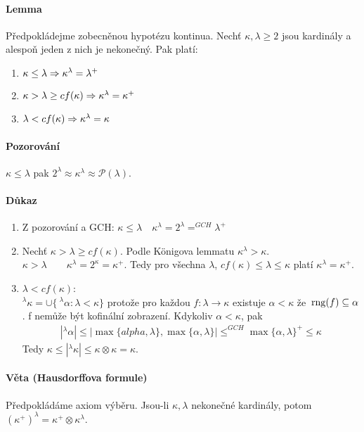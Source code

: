 \documentclass[a4paper,12pt,titlepage]{article}
\begin{document}
\paragraph{Lemma}
Předpokládejme zobecněnou hypotézu kontinua. Nechť $\kappa, \lambda \ge 2$ jsou
kardinály a alespoň jeden z nich je nekonečný. Pak platí:
\begin{enumerate}
	\item $\kappa \le \lambda \Rightarrow \kappa^\lambda = \lambda^+ $
	\item $\kappa > \lambda \ge cf(\kappa) \Rightarrow \kappa^\lambda = \kappa^+ $
	\item $\lambda < cf(\kappa) \Rightarrow \kappa^\lambda = \kappa$
\end{enumerate}
\paragraph{Pozorování}
$\kappa \le \lambda$ pak $2^\lambda \approx \kappa^\lambda \approx
\mathcal{P}(\lambda)$.
\paragraph{Důkaz}
\begin{enumerate}
	\item Z pozorování a GCH: $\kappa \le \lambda \quad \kappa^\lambda =
	2^\lambda =^{GCH} \lambda^+$
	\item Nechť $\kappa > \lambda \ge cf(\kappa)$. Podle Königova lemmatu
	$\kappa^\lambda > \kappa$. \\
	$\kappa > \lambda \qquad \kappa^\lambda = 2^\kappa = \kappa^+$. Tedy pro
	všechna $\lambda$, $cf(\kappa) \le \lambda \le \kappa$ platí $\kappa^\lambda =
	\kappa^+.$
	\item $\lambda < cf(\kappa)$: \\
	$^\lambda \kappa = \cup \{\ ^\lambda \alpha: \lambda < \kappa \}$ protože
	pro každou $f: \lambda \to \kappa$ existuje $\alpha < \kappa$ že $\operatorname*{\,rng}(f)
	\subseteq \alpha$. f nemůže být kofinální zobrazení. Kdykoliv $\alpha <
	\kappa$, pak
	\begin{align}
		| ^\lambda\alpha| \le | \max\{alpha, \lambda\}, \max\{\alpha, \lambda\}
		| \le^{GCH} \max\{\alpha, \lambda\}^+ \le \kappa
	\end{align}
	Tedy $\kappa \le | ^\lambda\kappa| \le \kappa \otimes \kappa = \kappa$.
\end{enumerate}
\paragraph{Věta (Hausdorffova formule)}
Předpokládáme axiom výběru. Jsou-li $\kappa, \lambda$ nekonečné kardinály, potom
$(\kappa^+)^\lambda = \kappa^+ \otimes \kappa^\lambda$.
\end{document}
